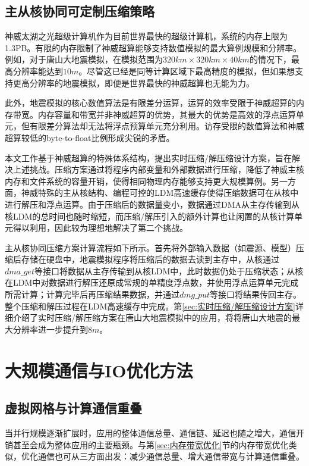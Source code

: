 \documentclass[degree=doctor]{thuthesis}
\begin{document}
\subsection{主从核协同可定制压缩策略}
神威太湖之光超级计算机作为目前世界最快的超级计算机，系统的内存上限为1.3PB。有限的内存限制了神威超算能够支持数值模拟的最大算例规模和分辨率。例如，对于唐山大地震模拟，在模拟范围为$320km\times 320km \times 40km$的情况下，最高分辨率能达到$10m$。尽管这已经是同等计算区域下最高精度的模拟，但如果想支持更高分辨率的地震模拟，即便是世界最快的神威超算也无能为力。

此外，地震模拟的核心数值算法是有限差分运算，运算的效率受限于神威超算的内存带宽。内存容量和带宽并非神威超算的优势，其最大的优势是高效的浮点运算单元，但有限差分算法却无法将浮点预算单元充分利用。访存受限的数值算法和神威超算较低的byte-to-float比例形成尖锐的矛盾。

本文工作基于神威超算的特殊体系结构，提出实时压缩/解压缩设计方案，旨在解决上述挑战。压缩方案通过将程序内部变量和外部数据进行压缩，降低了神威主核内存和文件系统的容量开销，使得相同物理内存能够支持更大规模算例。另一方面，神威特殊的主从核结构、编程可控的LDM高速缓存使得压缩数据可在从核中进行解压和浮点运算。由于压缩后的数据量变小，数据通过DMA从主存传输到从核LDM的总时间也随时缩短，而压缩/解压引入的额外计算也让闲置的从核计算单元得以利用，因此较为理想地解决了第二个挑战。

主从核协同压缩方案计算流程如下所示。首先将外部输入数据（如震源、模型）压缩后存储在硬盘中，地震模拟程序将压缩后的数据去读到主存中，从核通过$dma\_get$等接口将数据从主存传输到从核LDM中，此时数据仍处于压缩状态；从核在LDM中对数据进行解压还原成常规的单精度浮点数，并使用浮点运算单元完成所需计算；计算完毕后再压缩结果数据，并通过$dmg\_put$等接口将结果传回主存。整个压缩和解压过程在LDM高速缓存中完成。第\ref{sec:实时压缩/解压缩设计方案}详细介绍了实时压缩/解压缩方案在唐山大地震模拟中的应用，将将唐山大地震的最大分辨率进一步提升到$8m$。

\section{大规模通信与IO优化方法}

\subsection{虚拟网格与计算通信重叠}
当并行规模逐渐扩展时，应用的整体通信总量、通信链、延迟也随之增大，通信开销甚至会成为整体应用的主要瓶颈。与第\ref{sec:内存带宽优化}节的内存带宽优化类似，优化通信也可从三方面出发：减少通信总量、增大通信带宽与计算通信重叠。
\end{document}
